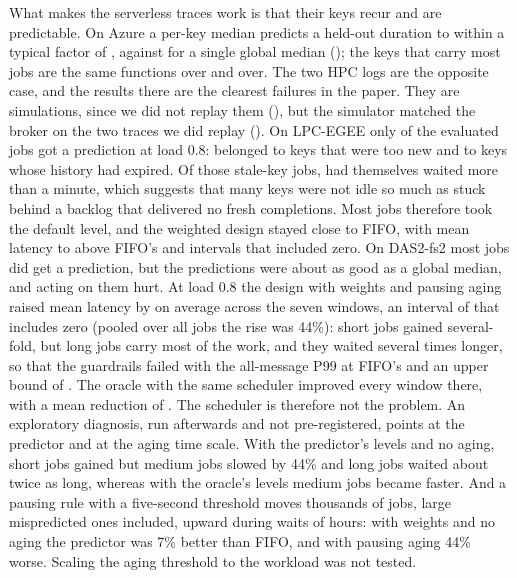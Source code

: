 What makes the serverless traces work is that their keys recur and are predictable. On Azure a per-key median predicts a
held-out duration to within a typical factor of \AzurePerKeyErrFactor{}, against \AzureGlobalErrFactor{} for a single global
median (); the keys that carry most jobs are the same functions over and over. The two HPC logs
are the opposite case, and the results there are the clearest failures in the paper. They are simulations, since we did not replay them (), but the simulator matched the broker on the two traces we did replay (). On LPC-EGEE only \LPCPredictedShare{}
of the \LPCJobs{} evaluated jobs got a prediction at load 0.8: \LPCColdShare{} belonged to keys that were too new and
\LPCStaleShare{} to keys whose history had expired. Of those stale-key jobs, \LPCStaleBacklogShare{} had themselves waited
more than a minute, which suggests that many keys were not idle so much as stuck behind a backlog that delivered no fresh
completions. Most jobs therefore took the default level, and the weighted design stayed close to FIFO, with mean latency
\LPCBHalfAbs{} to \LPCBNinetyFiveAbs{} above FIFO's and intervals that included zero. On DAS2-fs2 most jobs did get a prediction, but the predictions were about as good as a global median, and acting on them hurt. At load 0.8 the design with
weights and pausing aging raised mean latency by \DASBEightAbs{} on average across the seven windows, an interval of \DASBCIEight{} that includes zero (pooled over all jobs the rise was 44\%): short jobs gained several-fold, but long jobs carry most of
the work, and they waited several times longer, so that the guardrails failed with the all-message P99 at
\DASBPNinetyNineEight{} FIFO's and an upper bound of \DASBPNinetyNineUpperEight{}. The oracle with the same scheduler improved every
window there, with a mean reduction of \DASOracleBEightAbs{}. The scheduler is therefore not the problem. An exploratory diagnosis, run afterwards and not pre-registered, points at the predictor and at the aging time scale. With the predictor's levels and no aging, short jobs gained but medium jobs slowed by 44\% and long jobs waited about twice as long, whereas with the oracle's levels medium jobs became faster. And a pausing rule with a five-second threshold moves thousands of jobs, large mispredicted ones included, upward during waits of hours: with weights and no aging the predictor was 7\% better than FIFO, and with pausing aging 44\% worse. Scaling the aging threshold to the workload was not tested.

